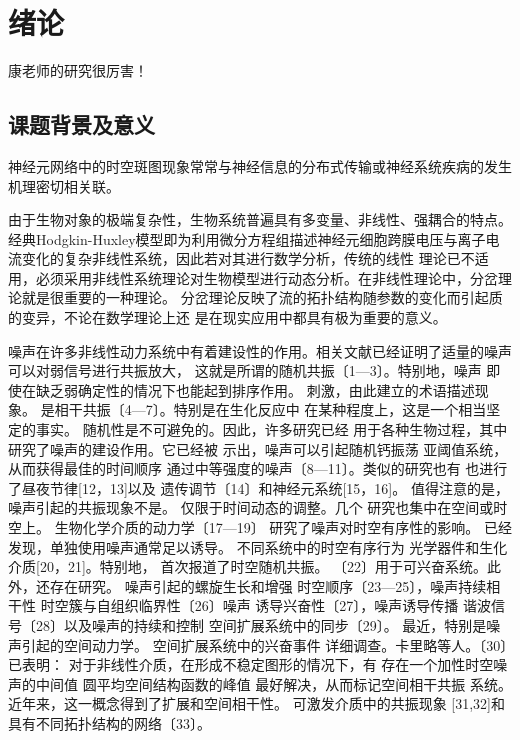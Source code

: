 \documentclass[
bachelor,
nofont, %
pdflinks,
]{xjtuthesis}
\begin{document}


% 
% 
\xjtucinfopage
\xjtueinfopage
\xjtutoc
\clearpage

\xjtucontent


\chapter{绪论}

康老师的研究\cite{xie2008change}很厉害！

\section{课题背景及意义}
神经元网络中的时空斑图现象常常与神经信息的分布式传输或神经系统疾病的发生机理密切相关联。

\medskip
由于生物对象的极端复杂性，生物系统普遍具有多变量、非线性、强耦合的特点。经典Hodgkin-Huxley模型即为利用微分方程组描述神经元细胞跨膜电压与离子电流变化的复杂非线性系统，因此若对其进行数学分析，传统的线性
理论已不适用，必须采用非线性系统理论对生物模型进行动态分析。在非线性理论中，分岔理论就是很重要的一种理论。
\medskip
分岔理论反映了流的拓扑结构随参数的变化而引起质的变异，不论在数学理论上还
是在现实应用中都具有极为重要的意义。


噪声在许多非线性动力系统中有着建设性的作用。相关文献已经证明了适量的噪声可以对弱信号进行共振放大，
这就是所谓的随机共振〔1—3〕。特别地，噪声
即使在缺乏弱确定性的情况下也能起到排序作用。
刺激，由此建立的术语描述现象。
是相干共振〔4—7〕。特别是在生化反应中
在某种程度上，这是一个相当坚定的事实。
随机性是不可避免的。因此，许多研究已经
用于各种生物过程，其中
研究了噪声的建设作用。它已经被
示出，噪声可以引起随机钙振荡
亚阈值系统，从而获得最佳的时间顺序
通过中等强度的噪声〔8—11〕。类似的研究也有
也进行了昼夜节律[12，13]以及
遗传调节〔14〕和神经元系统[15，16]。
值得注意的是，噪声引起的共振现象不是。
仅限于时间动态的调整。几个
研究也集中在空间或时空上。
生物化学介质的动力学〔17—19〕
研究了噪声对时空有序性的影响。
已经发现，单独使用噪声通常足以诱导。
不同系统中的时空有序行为
光学器件和生化介质[20，21]。特别地，
首次报道了时空随机共振。
〔22〕用于可兴奋系统。此外，还存在研究。
噪声引起的螺旋生长和增强
时空顺序〔23—25〕，噪声持续相干性
时空簇与自组织临界性〔26〕噪声
诱导兴奋性〔27〕，噪声诱导传播
谐波信号〔28〕以及噪声的持续和控制
空间扩展系统中的同步〔29〕。
最近，特别是噪声引起的空间动力学。
空间扩展系统中的兴奋事件
详细调查。卡里略等人。〔30〕已表明：
对于非线性介质，在形成不稳定图形的情况下，有
存在一个加性时空噪声的中间值
圆平均空间结构函数的峰值
最好解决，从而标记空间相干共振
系统。近年来，这一概念得到了扩展和空间相干性。
可激发介质中的共振现象
[31,32]和具有不同拓扑结构的网络〔33〕。
\end{document}
